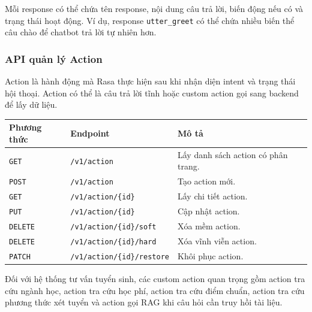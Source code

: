 Mỗi response có thể chứa tên response, nội dung câu trả lời, biến động nếu có và trạng thái hoạt động. Ví dụ, response \texttt{utter\_greet} có thể chứa nhiều biến thể câu chào để chatbot trả lời tự nhiên hơn.

\subsubsection{API quản lý Action}

Action là hành động mà Rasa thực hiện sau khi nhận diện intent và trạng thái hội thoại. Action có thể là câu trả lời tĩnh hoặc custom action gọi sang backend để lấy dữ liệu.

\begin{longtable}{|p{3cm}|p{5cm}|p{7cm}|}
\hline
\textbf{Phương thức} & \textbf{Endpoint} & \textbf{Mô tả} \\
\hline
\texttt{GET} & \texttt{/v1/action} & Lấy danh sách action có phân trang. \\
\hline
\texttt{POST} & \texttt{/v1/action} & Tạo action mới. \\
\hline
\texttt{GET} & \texttt{/v1/action/\{id\}} & Lấy chi tiết action. \\
\hline
\texttt{PUT} & \texttt{/v1/action/\{id\}} & Cập nhật action. \\
\hline
\texttt{DELETE} & \texttt{/v1/action/\{id\}/soft} & Xóa mềm action. \\
\hline
\texttt{DELETE} & \texttt{/v1/action/\{id\}/hard} & Xóa vĩnh viễn action. \\
\hline
\texttt{PATCH} & \texttt{/v1/action/\{id\}/restore} & Khôi phục action. \\
\hline
\end{longtable}

Đối với hệ thống tư vấn tuyển sinh, các custom action quan trọng gồm action tra cứu ngành học, action tra cứu học phí, action tra cứu điểm chuẩn, action tra cứu phương thức xét tuyển và action gọi RAG khi câu hỏi cần truy hồi tài liệu.
